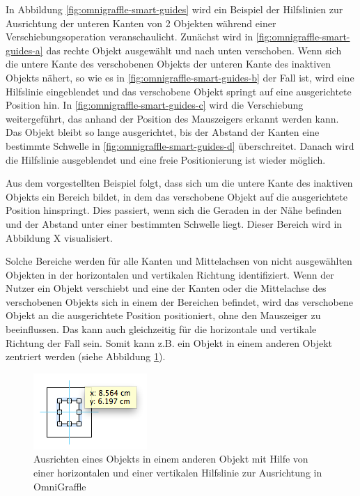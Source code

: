 In Abbildung \ref{fig:omnigraffle-smart-guides} wird ein Beispiel der Hilfslinien zur Ausrichtung der unteren Kanten von 2 Objekten während einer Verschiebungsoperation veranschaulicht. Zunächst wird in \ref{fig:omnigraffle-smart-guides-a} das rechte Objekt ausgewählt und nach unten verschoben. Wenn sich die untere Kante des verschobenen Objekts der unteren Kante des inaktiven Objekts nähert, so wie es in \ref{fig:omnigraffle-smart-guides-b} der Fall ist, wird eine Hilfslinie eingeblendet und das verschobene Objekt springt auf eine ausgerichtete Position hin. In \ref{fig:omnigraffle-smart-guides-c} wird die Verschiebung weitergeführt, das anhand der Position des Mauszeigers erkannt werden kann. Das Objekt bleibt so lange ausgerichtet, bis der Abstand der Kanten eine bestimmte Schwelle in \ref{fig:omnigraffle-smart-guides-d} überschreitet. Danach wird die Hilfslinie ausgeblendet und eine freie Positionierung ist wieder möglich.

Aus dem vorgestellten Beispiel folgt, dass sich um die untere Kante des inaktiven Objekts ein Bereich bildet, in dem das verschobene Objekt auf die ausgerichtete Position hinspringt. Dies passiert, wenn sich die Geraden in der Nähe befinden und der Abstand unter einer bestimmten Schwelle liegt. Dieser Bereich wird in Abbildung X visualisiert.


Solche Bereiche werden für alle Kanten und Mittelachsen von nicht ausgewählten Objekten in der horizontalen und vertikalen Richtung identifiziert. Wenn der Nutzer ein Objekt verschiebt und eine der Kanten oder die Mittelachse des verschobenen Objekts sich in einem der Bereichen befindet, wird das verschobene Objekt an die ausgerichtete Position positioniert, ohne den Mauszeiger zu beeinflussen. Das kann auch gleichzeitig für die horizontale und vertikale Richtung der Fall sein. Somit kann z.B. ein Objekt in einem anderen Objekt zentriert werden (siehe Abbildung \ref{fig:omnigraffle-alignment-guides-centering}).

\begin{figure}[hbt]
    \centering
    \includegraphics{resources/omnigraffle-alignment-guides-centering.png}
    \caption{Ausrichten eines Objekts in einem anderen Objekt mit Hilfe von einer horizontalen und einer vertikalen Hilfslinie zur Ausrichtung in OmniGraffle}
    \label{fig:omnigraffle-alignment-guides-centering}
\end{figure}

